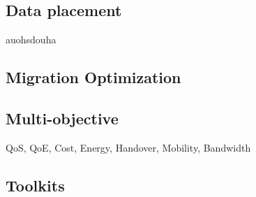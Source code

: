 

\subsection{Data placement}
\label{sec:Dataplacement}
auohsdouha



\subsection{Migration Optimization}
\label{sec:Migration}

\subsection{Multi-objective}
\label{sec:Multiobjective}
QoS, QoE, Cost, Energy, Handover, Mobility, Bandwidth
\subsection{Toolkits}
\label{sec:Toolkits}
